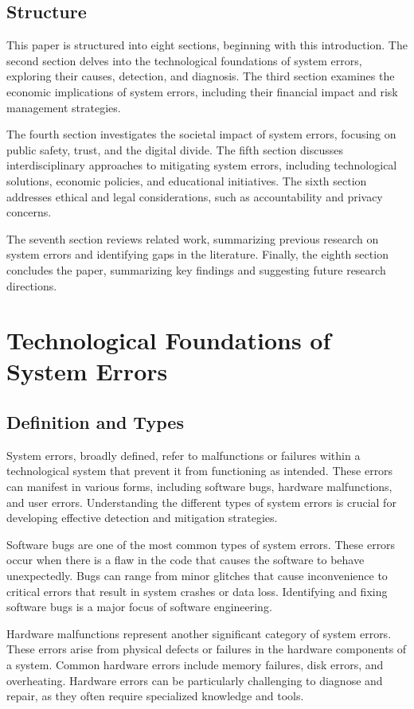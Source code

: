 \documentclass[10pt, conference, letterpaper]{IEEEtran}
\begin{document}
\subsection{Structure}
This paper is structured into eight sections, beginning with this introduction. The second section delves into the technological foundations of system errors, exploring their causes, detection, and diagnosis. The third section examines the economic implications of system errors, including their financial impact and risk management strategies.

The fourth section investigates the societal impact of system errors, focusing on public safety, trust, and the digital divide. The fifth section discusses interdisciplinary approaches to mitigating system errors, including technological solutions, economic policies, and educational initiatives. The sixth section addresses ethical and legal considerations, such as accountability and privacy concerns.

The seventh section reviews related work, summarizing previous research on system errors and identifying gaps in the literature. Finally, the eighth section concludes the paper, summarizing key findings and suggesting future research directions.

\section{Technological Foundations of System Errors}
\subsection{Definition and Types}
System errors, broadly defined, refer to malfunctions or failures within a technological system that prevent it from functioning as intended. These errors can manifest in various forms, including software bugs, hardware malfunctions, and user errors. Understanding the different types of system errors is crucial for developing effective detection and mitigation strategies.

Software bugs are one of the most common types of system errors. These errors occur when there is a flaw in the code that causes the software to behave unexpectedly. Bugs can range from minor glitches that cause inconvenience to critical errors that result in system crashes or data loss. Identifying and fixing software bugs is a major focus of software engineering.

Hardware malfunctions represent another significant category of system errors. These errors arise from physical defects or failures in the hardware components of a system. Common hardware errors include memory failures, disk errors, and overheating. Hardware errors can be particularly challenging to diagnose and repair, as they often require specialized knowledge and tools.
\end{document}
